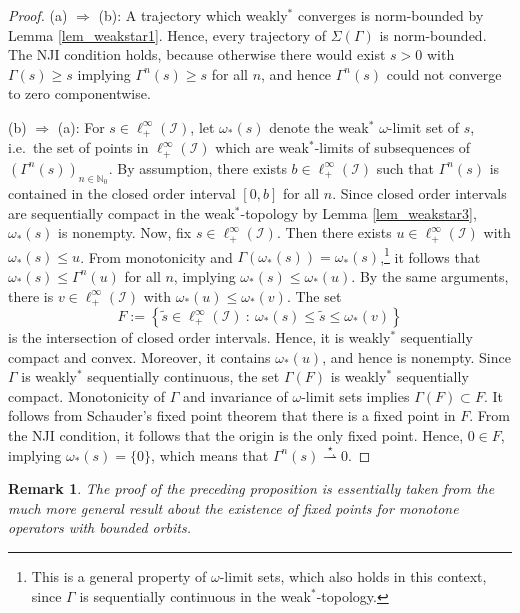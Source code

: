 \documentclass[10pt, oneside, a4paper]{article}
\newcommand{\N}{\mathbb{N}}
\newcommand{\IC}{\mathcal{I}}
\newtheorem{remark}{Remark}[section]
\begin{document}
\begin{proof}
(a) $\Rightarrow$ (b): A trajectory which weakly$^*$ converges is norm-bounded by Lemma \ref{lem_weakstar1}. Hence, every trajectory of $\Sigma(\Gamma)$ is norm-bounded. The NJI condition holds, because otherwise there would exist $s > 0$ with $\Gamma(s) \geq s$ implying $\Gamma^n(s) \geq s$ for all $n$, and hence $\Gamma^n(s)$ could not converge to zero componentwise.%

(b) $\Rightarrow$ (a): For $s \in \ell^{\infty}_+(\IC)$, let $\omega_*(s)$ denote the weak$^*$ $\omega$-limit set of $s$, i.e.~the set of points in $\ell^{\infty}_+(\IC)$ which are weak$^*$-limits of subsequences of $(\Gamma^n(s))_{n\in\N_0}$. By assumption, there exists $b \in \ell^{\infty}_+(\IC)$ such that $\Gamma^n(s)$ is contained in the closed order interval $[0,b]$ for all $n$. Since closed order intervals are sequentially compact in the weak$^*$-topology by Lemma \ref{lem_weakstar3}, $\omega_*(s)$ is nonempty. Now, fix $s \in \ell^{\infty}_+(\IC)$. Then there exists $u \in \ell^{\infty}_+(\IC)$ with $\omega_*(s) \leq u$. From monotonicity and $\Gamma(\omega_*(s)) = \omega_*(s)$,\footnote{This is a general property of $\omega$-limit sets, which also holds in this context, since $\Gamma$ is sequentially continuous in the weak$^*$-topology.} it follows that $\omega_*(s) \leq \Gamma^n(u)$ for all $n$, implying $\omega_*(s) \leq \omega_*(u)$. By the same arguments, there is $v \in \ell^{\infty}_+(\IC)$ with $\omega_*(u) \leq \omega_*(v)$. The set%
\begin{equation*}
  F := \left\{ \tilde{s} \in \ell^{\infty}_+(\IC)\ :\ \omega_*(s) \leq \tilde{s} \leq \omega_*(v) \right\}%
\end{equation*}
is the intersection of closed order intervals. Hence, it is weakly$^*$ sequentially compact and convex. Moreover, it contains $\omega_*(u)$, and hence is nonempty. Since $\Gamma$ is weakly$^*$ sequentially continuous, the set $\Gamma(F)$ is weakly$^*$ sequentially compact. Monotonicity of $\Gamma$ and invariance of $\omega$-limit sets implies $\Gamma(F) \subset F$. It follows from Schauder's fixed point theorem that there is a fixed point in $F$. From the NJI condition, it follows that the origin is the only fixed point. Hence, $0 \in F$, implying $\omega_*(s) = \{0\}$, which means that $\Gamma^n(s) \stackrel{\star}{\rightharpoonup} 0$.
\end{proof}

\begin{remark}
The proof of the preceding proposition is essentially taken from the much more general result \cite[Lem.~1]{Dan} about the existence of fixed points for monotone operators with bounded orbits.
\end{remark}
\end{document}
